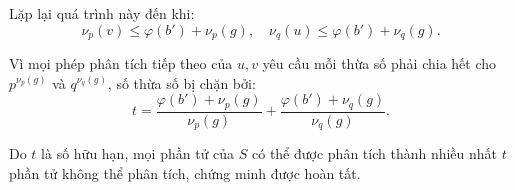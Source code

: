 \documentclass[../05-largest-exponent.tex]{subfiles}
\begin{document}
\begin{soln}
	Lặp lại quá trình này đến khi:
	\[
		\nu_p(v) \leq \varphi(b') + \nu_p(g), \quad \nu_q(u) \leq \varphi(b') + \nu_q(g).
	\]
	
	Vì mọi phép phân tích tiếp theo của \( u, v \) yêu cầu mỗi thừa số phải chia hết cho \( p^{\nu_p(g)} \) và \( q^{\nu_q(g)} \), số thừa số bị chặn bởi:
	\[
		t = \frac{\varphi(b') + \nu_p(g)}{\nu_p(g)} + \frac{\varphi(b') + \nu_q(g)}{\nu_q(g)}.
	\]
	
	Do \( t \) là số hữu hạn, mọi phần tử của \( S \) có thể được phân tích thành nhiều nhất \( t \) phần tử không thể phân tích, chứng minh được hoàn tất.
\end{soln}

\end{document}
